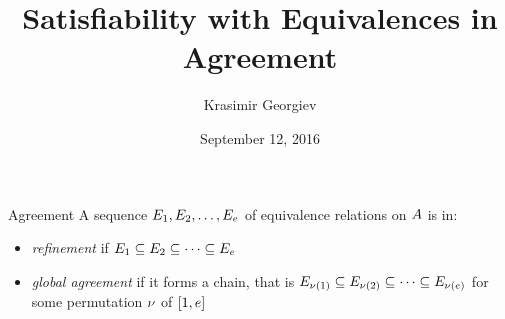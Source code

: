 \documentclass{beamer}
\begin{document}
\title{Satisfiability with Equivalences in Agreement}
\author{Krasimir Georgiev}
\date{September 12, 2016}
\frame{\titlepage}

\begin{frame}{Agreement}
A sequence $E_{1},E_{2},\dots,E_{e}$ of equivalence relations on
$A$ is in:
\pause
\begin{itemize}
  \item\alert<+>{\emph{refinement} if
  $E_{1}\subseteq E_{2}\subseteq\dots\subseteq E_{e}$}
  
  \item\alert<+>{\emph{global agreement} if it forms a chain, that is
  $E_{\nu(1)}\subseteq E_{\nu(2)}\subseteq\dots\subseteq E_{\nu(e)}$
  for some permutation $\nu$ of $[1,e]$}
  

\end{itemize}
\end{frame}
\end{document}
